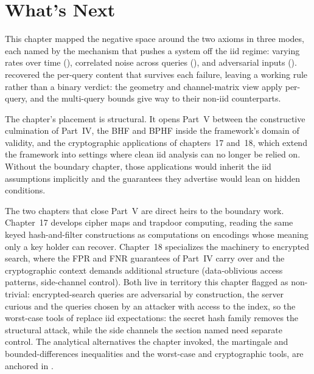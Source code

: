%

\section{What's Next}
\label{sec:ch16-whats-next}

This chapter mapped the negative space around the two axioms in three
modes, each named by the mechanism that pushes a system off the iid
regime: varying rates over time (), correlated
noise across queries (), and adversarial inputs
(). 
recovered the per-query content that survives each failure, leaving a
working rule rather than a binary verdict: the geometry and
channel-matrix view apply per-query, and the multi-query bounds give way
to their non-iid counterparts.

The chapter's placement is structural. It opens Part~V between the
constructive culmination of Part~IV, the BHF and BPHF inside the
framework's domain of validity, and the cryptographic applications of
chapters~17 and~18, which extend the framework into settings where clean
iid analysis can no longer be relied on. Without the boundary chapter,
those applications would inherit the iid assumptions implicitly and the
guarantees they advertise would lean on hidden conditions.

The two chapters that close Part~V are direct heirs to the boundary work.
Chapter~17 develops cipher maps and trapdoor computing, reading the same
keyed hash-and-filter constructions as computations on encodings whose
meaning only a key holder can recover. Chapter~18 specializes the machinery to encrypted
search, where the FPR and FNR guarantees of Part~IV carry over and the
cryptographic context demands additional structure (data-oblivious access
patterns, side-channel control). Both live in territory this chapter
flagged as non-trivial: encrypted-search queries are adversarial by
construction, the server curious and the queries chosen by an attacker
with access to the index, so the worst-case tools of
 replace iid expectations: the secret hash
family removes the structural attack, while the side channels the section
named need separate control. The analytical
alternatives the chapter invoked, the martingale and bounded-differences
inequalities and the worst-case and cryptographic tools, are anchored in
.
